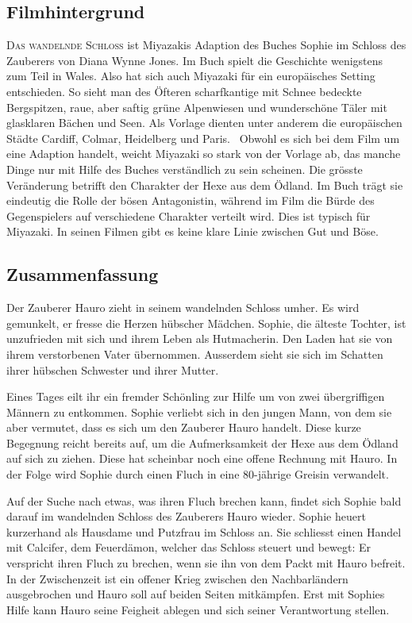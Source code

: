 \subsection{Filmhintergrund} 
\textsc{Das wandelnde Schloss} ist Miyazakis Adaption des Buches \glqq Sophie im Schloss des Zauberers \grqq von Diana Wynne Jones. Im Buch spielt die Geschichte wenigstens zum Teil in Wales. Also hat sich auch Miyazaki für ein europäisches Setting entschieden. So sieht man des Öfteren scharfkantige mit Schnee bedeckte Bergspitzen, raue, aber saftig grüne Alpenwiesen und wunderschöne Täler mit glasklaren Bächen und Seen. Als Vorlage dienten unter anderem die europäischen Städte Cardiff, Colmar, Heidelberg und Paris.~ Obwohl es sich bei dem Film um eine Adaption handelt, weicht Miyazaki so stark von der Vorlage ab, das manche Dinge nur mit Hilfe des Buches verständlich zu sein scheinen. 
Die grösste Veränderung betrifft den Charakter der Hexe aus dem Ödland. Im Buch trägt sie eindeutig die Rolle der bösen Antagonistin, während im Film die Bürde des Gegenspielers auf verschiedene Charakter verteilt wird. Dies ist typisch für Miyazaki. In seinen Filmen gibt es keine klare Linie zwischen Gut und Böse. 

\subsection{Zusammenfassung} 
Der Zauberer Hauro zieht in seinem wandelnden Schloss umher. Es wird gemunkelt, er fresse die Herzen hübscher Mädchen. Sophie, die älteste Tochter, ist unzufrieden mit sich und ihrem Leben als Hutmacherin. Den Laden hat sie von ihrem verstorbenen Vater übernommen. Ausserdem sieht sie sich im Schatten ihrer hübschen Schwester und ihrer Mutter. 

Eines Tages eilt ihr ein fremder Schönling zur Hilfe um von zwei übergriffigen Männern zu entkommen. Sophie verliebt sich in den jungen Mann, von dem sie aber vermutet, dass es sich um den Zauberer Hauro handelt. Diese kurze Begegnung reicht bereits auf, um die Aufmerksamkeit der Hexe aus dem Ödland auf sich zu ziehen. Diese hat scheinbar noch eine offene Rechnung mit Hauro. In der Folge wird Sophie durch einen Fluch in eine 80-jährige Greisin verwandelt. 

Auf der Suche nach etwas, was ihren Fluch brechen kann, findet sich Sophie bald darauf im wandelnden Schloss des Zauberers Hauro wieder. Sophie heuert kurzerhand als Hausdame und Putzfrau im Schloss an. Sie schliesst einen Handel mit Calcifer, dem Feuerdämon, welcher das Schloss steuert und bewegt: Er verspricht ihren Fluch zu brechen, wenn sie ihn von dem Packt mit Hauro befreit. In der Zwischenzeit ist ein offener Krieg zwischen den Nachbarländern ausgebrochen und Hauro soll auf beiden Seiten mitkämpfen. Erst mit Sophies Hilfe kann Hauro seine Feigheit ablegen und sich seiner Verantwortung stellen. 

